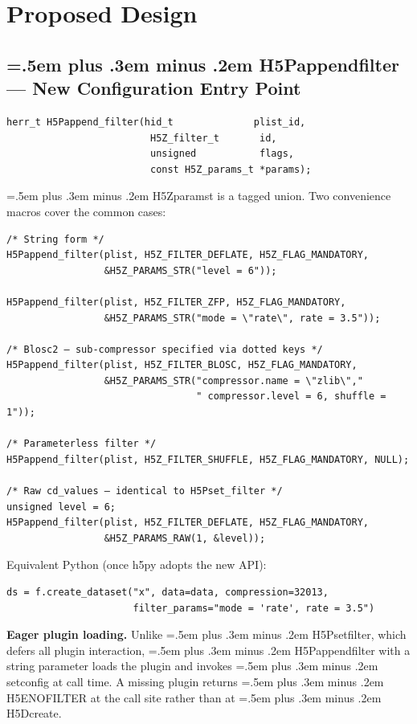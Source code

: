 \documentclass[letterpaper,hyper]{HDF5_RFC}
\renewcommand{\texttt}[1]{\begingroup\small\ttfamily\hyphenchar\font=45
  \spaceskip=.5em plus .3em minus .2em #1\endgroup}
\renewcommand{\_}{\oldtextunderscore\allowbreak}
\begin{document}
\section{Proposed Design}

\subsection{\texttt{H5Pappend\_filter} — New Configuration Entry Point}

\begin{verbatim}
herr_t H5Pappend_filter(hid_t              plist_id,
                         H5Z_filter_t       id,
                         unsigned           flags,
                         const H5Z_params_t *params);
\end{verbatim}

\texttt{H5Z\_params\_t} is a tagged union. Two convenience macros cover the
common cases:

\begin{verbatim}
/* String form */
H5Pappend_filter(plist, H5Z_FILTER_DEFLATE, H5Z_FLAG_MANDATORY,
                 &H5Z_PARAMS_STR("level = 6"));

H5Pappend_filter(plist, H5Z_FILTER_ZFP, H5Z_FLAG_MANDATORY,
                 &H5Z_PARAMS_STR("mode = \"rate\", rate = 3.5"));

/* Blosc2 — sub-compressor specified via dotted keys */
H5Pappend_filter(plist, H5Z_FILTER_BLOSC, H5Z_FLAG_MANDATORY,
                 &H5Z_PARAMS_STR("compressor.name = \"zlib\","
                                 " compressor.level = 6, shuffle = 1"));

/* Parameterless filter */
H5Pappend_filter(plist, H5Z_FILTER_SHUFFLE, H5Z_FLAG_MANDATORY, NULL);

/* Raw cd_values — identical to H5Pset_filter */
unsigned level = 6;
H5Pappend_filter(plist, H5Z_FILTER_DEFLATE, H5Z_FLAG_MANDATORY,
                 &H5Z_PARAMS_RAW(1, &level));
\end{verbatim}

Equivalent Python (once h5py adopts the new API):

\begin{verbatim}
ds = f.create_dataset("x", data=data, compression=32013,
                      filter_params="mode = 'rate', rate = 3.5")
\end{verbatim}

\noindent\textbf{Eager plugin loading.}  Unlike \texttt{H5Pset\_filter}, which
defers all plugin interaction, \texttt{H5Pappend\_filter} with a string
parameter loads the plugin and invokes \texttt{set\_config} at call time.  A
missing plugin returns \texttt{H5E\_NOFILTER} at the call site rather than at
\texttt{H5Dcreate}.
\end{document}
